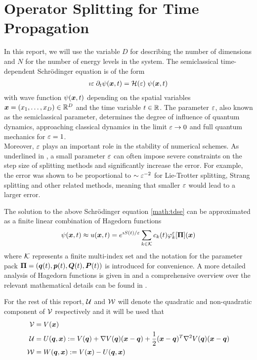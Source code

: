 \section{Operator Splitting for Time Propagation}
\label{sec:operatorsplitting}
%
In this report, we will use the variable $D$ for describing the number of dimensions and $N$ for the number of energy levels in the system.
The semiclassical time-dependent Schrödinger equation is of the form
%
\begin{align}
	\label{math:tdse}
	\imath \varepsilon \; \partial_t \psi (\bm{x},t) = \mathcal{H} (\varepsilon) \; \psi (\bm{x},t)
\end{align}
%
with wave function $\psi(\bm{x},t)$ depending on the spatial variables $\bm{x} = (x_1,\dots,x_D) \in \mathbb{R}^D$ and the time variable $t \in \mathbb{R}$.
The parameter $\varepsilon$, also known as the semiclassical parameter, determines the degree of influence of quantum dynamics, approaching classical dynamics in the limit $\varepsilon \rightarrow 0$ and full quantum mechanics for $\varepsilon = 1$. \\
Moreover, $\varepsilon$ plays an important role in the stability of numerical schemes.
As underlined in \cite{GH_convsemiclassical}, a small parameter $\varepsilon$ can often impose severe constraints on the step size of splitting methods and significantly increase the error. For example, the error was shown to be proportional to $\sim \varepsilon^{-2}$ for Lie-Trotter splitting, Strang splitting and other related methods, meaning that smaller $\varepsilon$ would lead to a larger error.
\par\medskip
%
The solution to the above Schrödinger equation \ref{math:tdse} can be approximated as a finite linear combination of Hagedorn functions 
\begin{align}
	\label{math:hagedornwp}
	\psi(\bm{x},t) \approx u(\bm{x},t)
	= e^{\imath S(t)/\varepsilon} \sum_{k \in \mathcal{K}} c_k(t) \varphi_k^{\varepsilon} [ \bm{\Pi} ] (\bm{x})
\end{align}
where $\mathcal{K}$ represents a finite multi-index set and the notation for the parameter pack $\bm{\Pi} = (\bm{q}(t),\bm{p}(t),\bm{Q}(t),\bm{P}(t))$ is introduced for convenience.
A more detailed analysis of Hagedorn functions is given in \cite{FGL_semiclassical_dynamics} and a comprehensive overview over the relevant mathematical details can be found in \cite{B_master_thesis}.
\par\medskip
%
For the rest of this report, $\mathcal{U}$ and $\mathcal{W}$ will denote the quadratic and non-quadratic component of $\mathcal{V}$ respectively and it will be used that
%
\begin{align}
	\mathcal{V} &= V(\bm{x}) \\ 
	\mathcal{U} &= U(\bm{q},\bm{x}) := V(\bm{q}) + \nabla V(\bm{q}) (\bm{x}-\bm{q})
	+ \frac{1}{2} (\bm{x}-\bm{q})^T \nabla^2 V(\bm{q}) (\bm{x}-\bm{q}) \\
	\mathcal{W} &= W(\bm{q},\bm{x}) := V(\bm{x}) - U(\bm{q},\bm{x})
\end{align}

